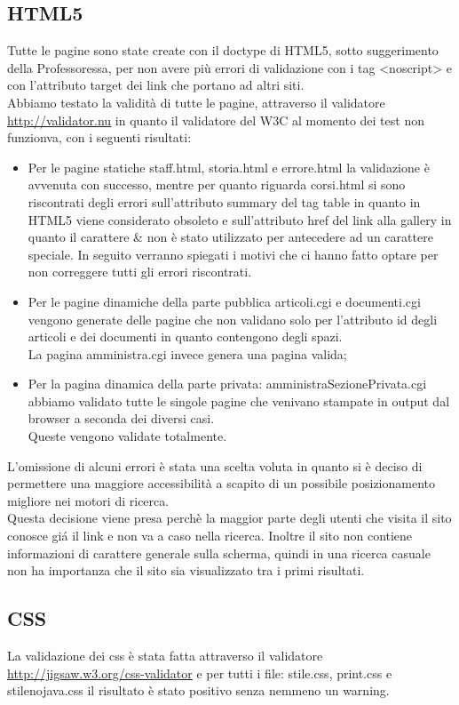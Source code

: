 \subsection{HTML5}
Tutte le pagine sono state create con il doctype di HTML5, sotto suggerimento della Professoressa,  per non avere pi\`u errori di validazione con i tag <noscript> e con l'attributo target dei link che portano ad altri siti.
\\ Abbiamo testato la validit\`a di tutte le pagine, attraverso il validatore \href{http://validator.nu}{http://validator.nu} in quanto il validatore del W3C al momento dei test non funzionva, con i seguenti risultati:
\begin{itemize}
	\item Per le pagine statiche staff.html, storia.html e errore.html la validazione \`e avvenuta con successo, mentre per quanto riguarda corsi.html si sono riscontrati degli errori sull'attributo summary del tag table in quanto in HTML5 viene considerato obsoleto e sull'attributo href del link alla gallery in quanto il carattere \& non \`e stato utilizzato per antecedere ad un carattere speciale. In seguito verranno spiegati i motivi che ci hanno fatto optare per non correggere tutti gli errori riscontrati.
	\item Per le pagine dinamiche della parte pubblica articoli.cgi e documenti.cgi vengono generate delle pagine che non validano solo per l'attributo id degli articoli e dei documenti in quanto contengono degli spazi.
	\\La pagina amministra.cgi invece genera una pagina valida;
	\item Per la pagina dinamica della parte privata: amministraSezionePrivata.cgi abbiamo validato tutte le singole pagine che venivano stampate in output dal browser a seconda dei diversi casi.
	\\ Queste vengono validate totalmente. 
\end{itemize}
L'omissione di alcuni errori \`e stata una scelta voluta in quanto si \`e deciso di permettere una maggiore accessibilit\`a a scapito di un possibile posizionamento migliore nei motori di ricerca.
\\  Questa decisione viene presa perch\`e la maggior parte degli utenti che visita il sito conosce gi\'a il link  e non va a caso nella ricerca. Inoltre il sito non contiene informazioni di carattere generale sulla scherma, quindi in una ricerca casuale non ha importanza che il sito sia visualizzato tra i primi risultati.

\subsection{CSS}
La validazione dei css \`e stata fatta attraverso il validatore 
\href{http://jigsaw.w3.org/css-validator}{http://jigsaw.w3.org/css-validator}
e per tutti i file: stile.css, print.css e stilenojava.css il risultato \`e stato positivo senza nemmeno un warning.
 

